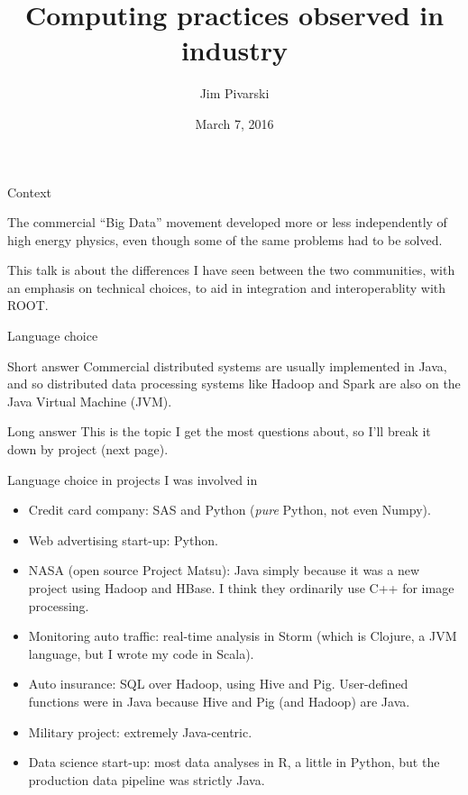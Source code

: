 \documentclass{beamer}
\title[2016-03-07-rootteam-hadoop]{Computing practices observed in industry}
\author{Jim Pivarski}
\institute{Princeton University -- DIANA}
\date{March 7, 2016}
\begin{document}
\begin{frame}
  \titlepage
\end{frame}

\begin{frame}{Context}

\begin{block}{}
The commercial ``Big Data'' movement developed more or less independently of high energy physics, even though some of the same problems had to be solved.
\end{block}

\begin{block}{}
This talk is about the differences I have seen between the two communities, with an emphasis on technical choices, to aid in integration and interoperablity with ROOT.
\end{block}
\end{frame}

\begin{frame}{Language choice}
\begin{block}{Short answer}
Commercial distributed systems are usually implemented in Java, and so distributed data processing systems like Hadoop and Spark are also on the Java Virtual Machine (JVM).
\end{block}

\begin{block}{Long answer}
This is the topic I get the most questions about, so I'll break it down by project (next page).
\end{block}
\end{frame}

\begin{frame}{Language choice in projects I was involved in}
\begin{itemize}
\item Credit card company: SAS and Python ({\it pure} Python, not even Numpy).

\item Web advertising start-up: Python.

\item NASA (open source Project Matsu): Java simply because it was a new project using Hadoop and HBase. I think they ordinarily use C++ for image processing.

\item Monitoring auto traffic: real-time analysis in Storm (which is Clojure, a JVM language, but I wrote my code in Scala).

\item Auto insurance: SQL over Hadoop, using Hive and Pig. User-defined functions were in Java because Hive and Pig (and Hadoop) are Java.

\item Military project: extremely Java-centric.

\item Data science start-up: most data analyses in R, a little in Python, but the production data pipeline was strictly Java.
\end{itemize}
\end{frame}
\end{document}
